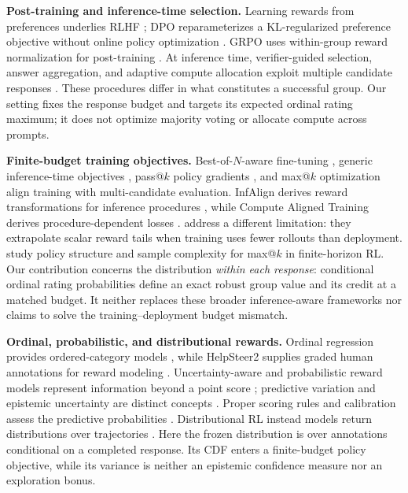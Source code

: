 \documentclass{article}
\theoremstyle{definition}
\theoremstyle{remark}
\begin{document}
\textbf{Post-training and inference-time selection.}
Learning rewards from preferences underlies RLHF
\citep{christiano2017deep,stiennon2020learning,ouyang2022training}; DPO
reparameterizes a KL-regularized preference objective without online policy
optimization \citep{rafailov2023direct}. GRPO uses within-group reward
normalization for post-training \citep{shao2024deepseekmath,guo2025deepseekr1}.
At inference time, verifier-guided selection, answer aggregation, and adaptive
compute allocation exploit multiple candidate responses
\citep{cobbe2021training,wang2023selfconsistency,snell2025scaling}.
These procedures differ in what constitutes a successful group. Our setting
fixes the response budget and targets its expected ordinal rating maximum;
it does not optimize majority voting or allocate compute across prompts.

\textbf{Finite-budget training objectives.}
Best-of-\(N\)-aware fine-tuning \citep{chow2025inference}, generic
inference-time objectives \citep{tang2025inference}, pass@\(k\) policy
gradients \citep{walder2025pkpo}, and max@\(k\) optimization
\citep{bagirov2025best} align training with multi-candidate evaluation.
InfAlign derives reward transformations for inference procedures
\citep{balashankar2024infalign}, while Compute Aligned Training derives
procedure-dependent losses \citep{ousherovitch2026compute}.
\citet{li2026posttraining} address a different limitation: they extrapolate
scalar reward tails when training uses fewer rollouts than deployment.
\citet{poiani2026maxk} study policy structure and sample complexity for
max@\(k\) in finite-horizon RL. Our contribution concerns the distribution
\emph{within each response}: conditional ordinal rating probabilities define
an exact robust group value and its credit at a matched budget. It neither
replaces these broader inference-aware frameworks nor claims to solve the
training--deployment budget mismatch.

\textbf{Ordinal, probabilistic, and distributional rewards.}
Ordinal regression provides ordered-category models
\citep{mccullagh1980regression}, while HelpSteer2 supplies graded human
annotations for reward modeling \citep{wang2024helpsteer2}. Uncertainty-aware
and probabilistic reward models represent information beyond a point score
\citep{lou2024uncertainty,sun2025purm}; predictive variation and epistemic
uncertainty are distinct concepts \citep{kendall2017uncertainties}.
Proper scoring rules and calibration assess the predictive probabilities
\citep{gneiting2007strictly,guo2017calibration}. Distributional RL instead
models return distributions over trajectories
\citep{bellemare2017distributional,dabney2018distributional}.
Here the frozen distribution is over annotations conditional on a completed
response. Its CDF enters a finite-budget policy objective, while its variance
is neither an epistemic confidence measure nor an exploration bonus.
\end{document}
